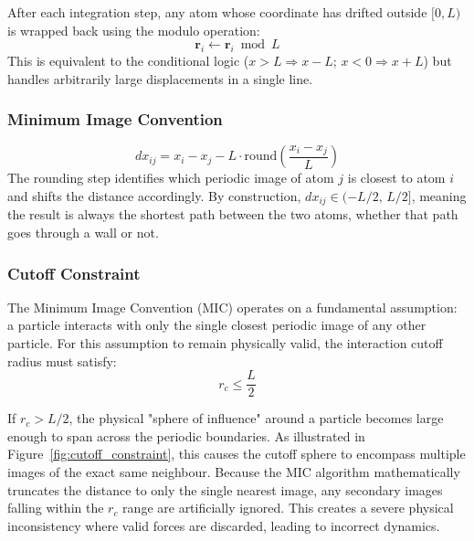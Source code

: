 After each integration step, any atom whose coordinate has drifted outside $[0, L)$ is wrapped back using the modulo operation:
\begin{equation}
    \mathbf{r}_i \leftarrow \mathbf{r}_i \bmod L
    \label{eq:pbc_wrap}
\end{equation}
This is equivalent to the conditional logic ($x > L \Rightarrow x - L$; $x < 0 \Rightarrow x + L$) but handles arbitrarily large displacements in a single line.

\subsubsection{Minimum Image Convention}
\label{sec:mic}

\begin{equation}
    dx_{ij} = x_i - x_j - L \cdot \mathrm{round}\!\left(\frac{x_i - x_j}{L}\right)
    \label{eq:mic}
\end{equation}
The rounding step identifies which periodic image of atom $j$ is closest to atom $i$ and shifts the distance accordingly. By construction, $dx_{ij} \in (-L/2,\, L/2]$, meaning the result is always the shortest path between the two atoms, whether that path goes through a wall or not.

\subsubsection{Cutoff Constraint}
\label{sec:mic_constraint}

The Minimum Image Convention (MIC) operates on a fundamental assumption: a particle interacts with only the single closest periodic image of any other particle. For this assumption to remain physically valid, the interaction cutoff radius must satisfy:
\begin{equation}
    r_c \leq \frac{L}{2}
    \label{eq:cutoff_constraint}
\end{equation}

If $r_c > L/2$, the physical "sphere of influence" around a particle becomes large enough to span across the periodic boundaries. As illustrated in Figure~\ref{fig:cutoff_constraint}, this causes the cutoff sphere to encompass multiple images of the exact same neighbour. Because the MIC algorithm mathematically truncates the distance to only the single nearest image, any secondary images falling within the $r_c$ range are artificially ignored. This creates a severe physical inconsistency where valid forces are discarded, leading to incorrect dynamics. 

